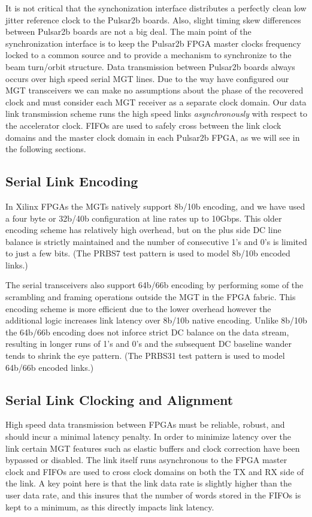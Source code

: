 \documentclass[letterpaper]{article}
\begin{document}
It is not critical that the synchonization interface distributes a perfectly clean low jitter reference clock to the Pulsar2b boards.  Also, slight timing skew differences between Pulsar2b boards are not a big deal. The main point of the synchronization interface is to keep the Pulsar2b FPGA master clocks frequency locked to a common source and to provide a mechanism to synchronize to the beam turn/orbit structure.  Data transmission between Pulsar2b boards always occurs over high speed serial MGT lines.  Due to the way have configured our MGT transceivers we can make no assumptions about the phase of the recovered clock and must consider each MGT receiver as a separate clock domain.  Our data link transmission scheme runs the high speed links \emph{asynchronously} with respect to the accelerator clock.  FIFOs are used to safely cross between the link clock domains and the master clock domain in each Pulsar2b FPGA, as we will see in the following sections.

\subsection{Serial Link Encoding}

In Xilinx FPGAs the MGTs natively support 8b/10b encoding, and we have used a four byte or 32b/40b configuration at line rates up to 10Gbps.  This older encoding scheme has relatively high overhead, but on the plus side DC line balance is strictly maintained and the number of consecutive 1's and 0's is limited to just a few bits.  (The PRBS7 test pattern is used to model 8b/10b encoded links.)

The serial transceivers also support 64b/66b encoding by performing some of the scrambling and framing operations outside the MGT in the FPGA fabric.  This encoding scheme is more efficient due to the lower overhead however the additional logic increases link latency over 8b/10b native encoding.  Unlike 8b/10b the 64b/66b encoding does not inforce strict DC balance on the data stream, resulting in longer runs of 1's and 0's and the subsequent DC baseline wander tends to shrink the eye pattern.  (The PRBS31 test pattern is used to model 64b/66b encoded links.)

\subsection{Serial Link Clocking and Alignment}
\label{linkclocking}

High speed data transmission between FPGAs must be reliable, robust, and should incur a minimal latency penalty.  In order to minimize latency over the link certain MGT features such as elastic buffers and clock correction have been bypassed or disabled.  The link itself runs asynchronous to the FPGA master clock and FIFOs are used to cross clock domains on both the TX and RX side of the link.  A key point here is that the link data rate is slightly higher than the user data rate, and this insures that the number of words stored in the FIFOs is kept to a minimum, as this directly impacts link latency.
\end{document}

